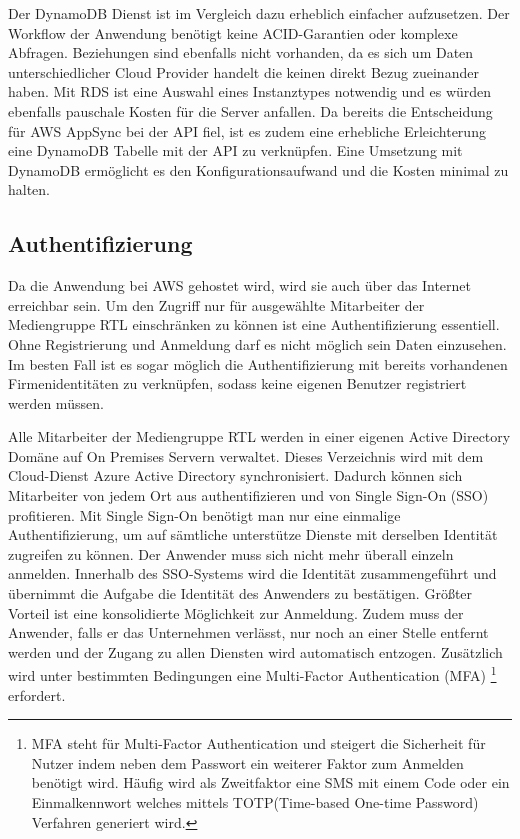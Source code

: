 {Der DynamoDB Dienst ist im Vergleich dazu erheblich einfacher aufzusetzen.
Der Workflow der Anwendung benötigt keine ACID-Garantien oder komplexe Abfragen. Beziehungen sind ebenfalls nicht vorhanden, da es sich um Daten unterschiedlicher
Cloud Provider handelt die keinen direkt Bezug zueinander haben.
Mit RDS ist eine Auswahl eines Instanztypes notwendig und es würden ebenfalls pauschale Kosten für die Server anfallen.
Da bereits die Entscheidung für AWS AppSync bei der API fiel, ist es zudem eine erhebliche Erleichterung eine DynamoDB Tabelle mit der API zu verknüpfen.
Eine Umsetzung mit DynamoDB ermöglicht es den Konfigurationsaufwand und die Kosten minimal zu halten.


\subsection{Authentifizierung}
\label{Authentifizierung}
Da die Anwendung bei AWS gehostet wird, wird sie auch über das Internet erreichbar sein.
Um den Zugriff nur für ausgewählte Mitarbeiter der Mediengruppe RTL einschränken zu können ist eine Authentifizierung essentiell.
Ohne Registrierung und Anmeldung darf es nicht möglich sein Daten einzusehen.
Im besten Fall ist es sogar möglich die Authentifizierung mit bereits vorhandenen Firmenidentitäten zu verknüpfen, sodass keine eigenen
Benutzer registriert werden müssen.

Alle Mitarbeiter der Mediengruppe RTL werden in einer eigenen Active Directory Domäne auf On Premises Servern verwaltet.
Dieses Verzeichnis wird mit dem Cloud-Dienst Azure Active Directory synchronisiert.
Dadurch können sich Mitarbeiter von jedem Ort aus authentifizieren und von Single Sign-On (SSO) profitieren.
Mit Single Sign-On benötigt man nur eine einmalige Authentifizierung, um auf sämtliche unterstütze Dienste mit derselben Identität zugreifen zu können.
Der Anwender muss sich nicht mehr überall einzeln anmelden.
Innerhalb des SSO-Systems wird die Identität zusammengeführt und übernimmt die Aufgabe die Identität des Anwenders zu bestätigen.
Größter Vorteil ist eine konsolidierte Möglichkeit zur Anmeldung. Zudem muss der Anwender, falls er das Unternehmen verlässt, nur noch an einer Stelle entfernt werden und der Zugang zu allen Diensten wird automatisch entzogen.
Zusätzlich wird unter bestimmten Bedingungen eine Multi-Factor Authentication (MFA) \footnote{MFA steht für Multi-Factor Authentication und steigert die Sicherheit für Nutzer indem neben dem Passwort
ein weiterer Faktor zum Anmelden benötigt wird. Häufig wird als Zweitfaktor eine SMS mit einem Code oder
ein Einmalkennwort welches mittels TOTP(Time-based One-time Password) Verfahren generiert wird. } erfordert.

}
